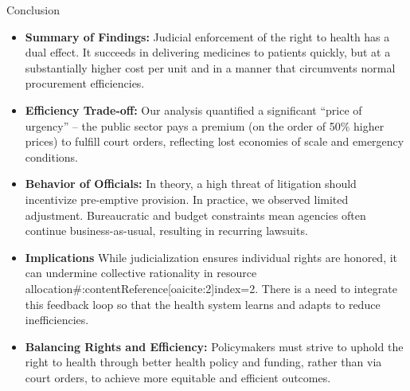 \documentclass{beamer}
\begin{document}
\begin{frame}{Conclusion}
\begin{itemize}
  \item \textbf{Summary of Findings:} Judicial enforcement of the right to health has a dual effect. It succeeds in delivering medicines to patients quickly, but at a substantially higher cost per unit and in a manner that circumvents normal procurement efficiencies.
  \item \textbf{Efficiency Trade-off:} Our analysis quantified a significant “price of urgency” – the public sector pays a premium (on the order of 50\% higher prices) to fulfill court orders, reflecting lost economies of scale and emergency conditions.
  \item \textbf{Behavior of Officials:} In theory, a high threat of litigation should incentivize pre-emptive provision. In practice, we observed limited adjustment. Bureaucratic and budget constraints mean agencies often continue business-as-usual, resulting in recurring lawsuits.
  \item \textbf{Implications\:} While judicialization ensures individual rights are honored, it can undermine collective rationality in resource allocation\#:contentReference[oaicite:2]{index=2}. There is a need to integrate this feedback loop so that the health system learns and adapts to reduce inefficiencies.
  \item \textbf{Balancing Rights and Efficiency:} Policymakers must strive to uphold the right to health through better health policy and funding, rather than via court orders, to achieve more equitable and efficient outcomes.
\end{itemize}
\end{frame}
\end{document}
